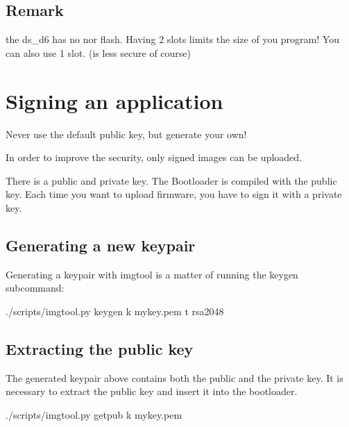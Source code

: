 \documentclass[letterpaper,10pt,english]{sphinxmanual}
\begin{document}
\subsection{Remark}
\label{\detokenize{fota/partitions:remark}}
the ds\_d6 has no nor flash. Having 2 slots limits the size of you program!
You can also use 1 slot. (is less secure of course)


\section{Signing an application}
\label{\detokenize{fota/signing:signing-an-application}}\label{\detokenize{fota/signing:signing}}\label{\detokenize{fota/signing::doc}}
Never use the default public key, but generate your own!

In order to improve the security, only signed images can be uploaded.

There is a public and private key.
The Bootloader is compiled with the public key.
Each time you want to upload firmware, you have to sign it with a private key.



\subsection{Generating a new keypair}
\label{\detokenize{fota/signing:generating-a-new-keypair}}
Generating a keypair with imgtool is a matter of running the keygen
subcommand:

\begin{sphinxVerbatim}[commandchars=\\\{\}]
 ./scripts/imgtool.py keygen \PYGZhy{}k mykey.pem \PYGZhy{}t rsa\PYGZhy{}2048
\end{sphinxVerbatim}


\subsection{Extracting the public key}
\label{\detokenize{fota/signing:extracting-the-public-key}}
The generated keypair above contains both the public and the private
key.  It is necessary to extract the public key and insert it into the
bootloader.

\begin{sphinxVerbatim}[commandchars=\\\{\}]
 ./scripts/imgtool.py getpub \PYGZhy{}k mykey.pem
\end{sphinxVerbatim}
\end{document}
